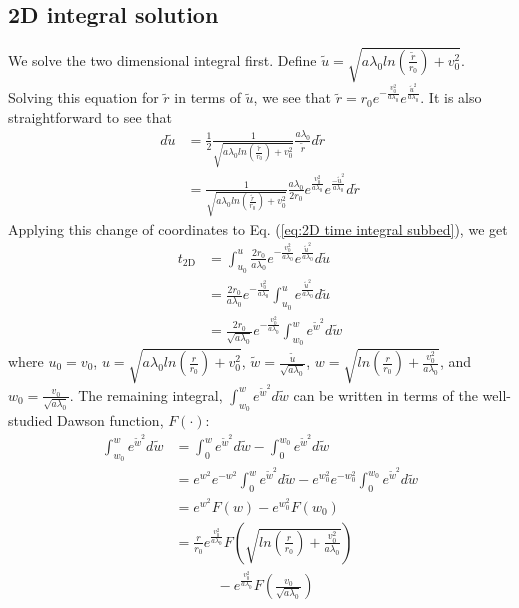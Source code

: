 \documentclass[aps,prl,twocolumn,showpacs,superscriptaddress,groupedaddress]{revtex4-1}  %
\begin{document}
\subsection{2D integral solution}
We solve the two dimensional integral first.  Define $\tilde{u} = \sqrt{a \lambda_0 ln\left(\frac{\tilde{r}}{r_0}\right) + v_0^2}$.  Solving this equation for $\tilde{r}$ in terms of
$\tilde{u}$, we see that $\tilde{r} = r_0 e^{-\frac{v_0^2}{a \lambda_0}}e^{\frac{\tilde{u}^2}{a \lambda_0}}$.  It is
also straightforward to see that 
\begin{align}
  d \tilde{u} &= \frac{1}{2} \frac{1}{ \sqrt{a \lambda_0 ln\left(\frac{\tilde{r}}{r_0}\right) + v_0^2}} \frac{a \lambda_0}{\tilde{r}} d \tilde{r}\nonumber\\
                  &= \frac{1}{ \sqrt{a \lambda_0 ln\left(\frac{\tilde{r}}{r_0}\right) + v_0^2}} \frac{a \lambda_0}{2 r_0}e^{\frac{v_0^2}{a \lambda_0}} e^{\frac{-\tilde{u}^2}{a \lambda_0}} d \tilde{r} \nonumber
\end{align}
Applying this change of coordinates to Eq. (\ref{eq:2D time integral subbed}), we get
\begin{align}
  t_\text{2D} &= \int_{u_0}^{u} \frac{2 r_0}{a \lambda_0}e^{-\frac{v_0^2}{a \lambda_0}} e^{\frac{\tilde{u}^2}{a \lambda_0}} d \tilde{u}\nonumber\\
                    &= \frac{2 r_0}{a \lambda_0}e^{-\frac{v_0^2}{a \lambda_0}} \int_{u_0}^{u} e^{\frac{\tilde{u}^2}{a \lambda_0}} d \tilde{u}\nonumber\\
                    &= \frac{2 r_0}{\sqrt{a \lambda_0}}e^{-\frac{v_0^2}{a \lambda_0}} \int_{w_0}^{w} e^{\tilde{w}^2} d \tilde{w}\label{eq:2D time integral in w}
\end{align}
where $u_0 = v_0$, $u = \sqrt{a \lambda_0 ln\left(\frac{r}{r_0}\right) + v_0^2}$, 
$\tilde{w} = \frac{\tilde{u}}{\sqrt{a \lambda_0}}$, $w = \sqrt{ln\left(\frac{r}{r_0}\right) + \frac{v_0^2}{a \lambda_0}}$, 
and $w_0 = \frac{v_0}{\sqrt{a \lambda_0}}$.  The remaining integral, 
$\int_{w_0}^{w} e^{\tilde{w}^2} d \tilde{w}$ can be written in terms of the well-studied Dawson function, $F(\cdot)$:
\begin{align}
\int_{w_0}^{w} e^{\tilde{w}^2} d \tilde{w} &= \int_{0}^{w} e^{\tilde{w}^2} d \tilde{w} - \int_{0}^{w_0} e^{\tilde{w}^2} d \tilde{w}\nonumber\\
                                                                &= e^{w^2} e^{-w^2} \int_{0}^{w} e^{\tilde{w}^2} d \tilde{w} - e^{w_0^2} e^{-w_0^2} \int_{0}^{w_0} e^{\tilde{w}^2} d \tilde{w}\nonumber\\
                                                                &= e^{w^2}F(w) - e^{w_0^2} F(w_0) \nonumber\\
                                                                &= \frac{r}{r_0} e^\frac{v_0^2}{a \lambda_0}F\left(\sqrt{ln\left(\frac{r}{r_0}\right) + \frac{v_0^2}{a \lambda_0}}\right) \nonumber\\
                                                                &\quad\quad\quad - e^\frac{v_0^2}{a \lambda_0}F\left(\frac{v_0}{\sqrt{a \lambda_0}}\right)\label{eq:integral as Dawson}
\end{align}
\end{document}
